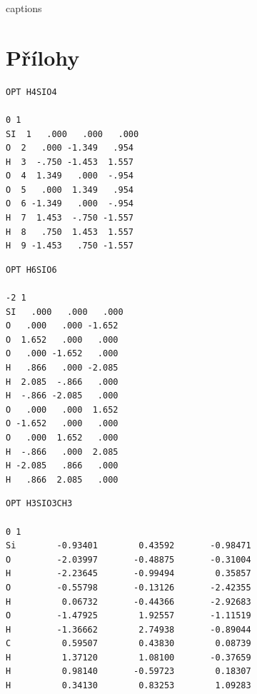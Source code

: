 \documentclass[
  digital, %
  table,   %
  lof,     %
  lot,     %
]{fithesis3}
\begin{document}
{\csname captions\languagename\endcsname %
\makeatletter %
  \thesis@selectLocale{\thesis@locale}\makeatother
\printbibliography[heading=bibintoc]} %
\appendix %
\chapter{Přílohy}
 \begin{lstlisting}[frame=single, caption={\ce{H4SiO4} },label=DescriptiveLabel]
OPT H4SIO4 

0 1
SI  1   .000   .000   .000 
O  2   .000 -1.349   .954 
H  3  -.750 -1.453  1.557 
O  4  1.349   .000  -.954 
O  5   .000  1.349   .954 
O  6 -1.349   .000  -.954 
H  7  1.453  -.750 -1.557 
H  8   .750  1.453  1.557 
H  9 -1.453   .750 -1.557 
 \end{lstlisting}

 \begin{lstlisting}[frame=single, caption={\ce{(H6SiO6)^{2-}} },label=DescriptiveLabel]
OPT H6SIO6 

-2 1
SI   .000   .000   .000  
O   .000   .000 -1.652 
O  1.652   .000   .000 
O   .000 -1.652   .000 
H   .866   .000 -2.085 
H  2.085  -.866   .000 
H  -.866 -2.085   .000 
O   .000   .000  1.652 
O -1.652   .000   .000 
O   .000  1.652   .000 
H  -.866   .000  2.085 
H -2.085   .866   .000 
H   .866  2.085   .000
 \end{lstlisting}
  
  \newpage
  
  \begin{lstlisting}[frame=single, caption={\ce{H3SiO3CH3}},label=DescriptiveLabel]
OPT H3SIO3CH3

0 1
Si        -0.93401        0.43592       -0.98471
O         -2.03997       -0.48875       -0.31004
H         -2.23645       -0.99494        0.35857
O         -0.55798       -0.13126       -2.42355
H          0.06732       -0.44366       -2.92683
O         -1.47925        1.92557       -1.11519
H         -1.36662        2.74938       -0.89044
C          0.59507        0.43830        0.08739
H          1.37120        1.08100       -0.37659
H          0.98140       -0.59723        0.18307
H          0.34130        0.83253        1.09283
 \end{lstlisting}
\end{document}
